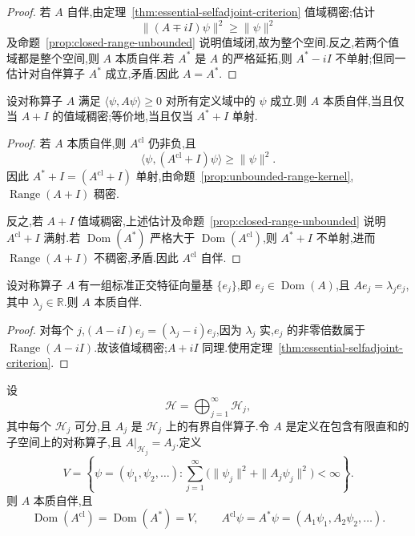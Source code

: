 \begin{proof}
若 \(A\) 自伴,由定理~\ref{thm:essential-selfadjoint-criterion} 值域稠密;估计
\[
\|(A\mp iI)\psi\|^{2}\geq\|\psi\|^{2}
\]
及命题~\ref{prop:closed-range-unbounded} 说明值域闭,故为整个空间.反之,若两个值域都是整个空间,则 \(A\) 本质自伴.若 \(A^{*}\) 是 \(A\) 的严格延拓,则 \(A^{*}-iI\) 不单射;但同一估计对自伴算子 \(A^{*}\) 成立,矛盾.因此 \(A=A^{*}\).
\end{proof}

\begin{theorem}[非负对称算子的判据]\label{thm:nonnegative-essential-selfadjoint}
设对称算子 \(A\) 满足 \(\langle\psi,A\psi\rangle\geq0\) 对所有定义域中的 \(\psi\) 成立.则 \(A\) 本质自伴,当且仅当 \(A+I\) 的值域稠密;等价地,当且仅当 \(A^{*}+I\) 单射.
\end{theorem}

\begin{proof}
若 \(A\) 本质自伴,则 \(A^{\mathrm{cl}}\) 仍非负,且
\[
\langle\psi,(A^{\mathrm{cl}}+I)\psi\rangle
\geq\|\psi\|^{2}.
\]
因此 \(A^{*}+I=(A^{\mathrm{cl}}+I)\) 单射,由命题~\ref{prop:unbounded-range-kernel},\(\operatorname{Range}(A+I)\) 稠密.

反之,若 \(A+I\) 值域稠密,上述估计及命题~\ref{prop:closed-range-unbounded} 说明 \(A^{\mathrm{cl}}+I\) 满射.若 \(\operatorname{Dom}(A^{*})\) 严格大于 \(\operatorname{Dom}(A^{\mathrm{cl}})\),则 \(A^{*}+I\) 不单射,进而 \(\operatorname{Range}(A+I)\) 不稠密,矛盾.因此 \(A^{\mathrm{cl}}\) 自伴.
\end{proof}

\begin{example}[有标准正交特征向量基的对称算子]\label{ex:symmetric-orthonormal-eigenbasis}
设对称算子 \(A\) 有一组标准正交特征向量基 \(\{e_{j}\}\),即 \(e_{j}\in\operatorname{Dom}(A)\),且 \(Ae_{j}=\lambda_{j}e_{j}\),其中 \(\lambda_{j}\in\mathbb{R}\).则 \(A\) 本质自伴.
\end{example}

\begin{proof}
对每个 \(j\),\((A-iI)e_{j}=(\lambda_{j}-i)e_{j}\),因为 \(\lambda_{j}\) 实,\(e_{j}\) 的非零倍数属于 \(\operatorname{Range}(A-iI)\).故该值域稠密;\(A+iI\) 同理.使用定理~\ref{thm:essential-selfadjoint-criterion}.
\end{proof}

\begin{example}\label{ex:direct-sum-essential-selfadjoint}
设
\[
\mathcal{H}=\bigoplus_{j=1}^{\infty}\mathcal{H}_{j},
\]
其中每个 \(\mathcal{H}_{j}\) 可分,且 \(A_{j}\) 是 \(\mathcal{H}_{j}\) 上的有界自伴算子.令 \(A\) 是定义在包含有限直和的子空间上的对称算子,且 \(A|_{\mathcal{H}_{j}}=A_{j}\).定义
\[
V=\left\{\psi=(\psi_{1},\psi_{2},\ldots):\sum_{j=1}^{\infty}\bigl(\|\psi_{j}\|^{2}+\|A_{j}\psi_{j}\|^{2}\bigr)<\infty\right\}.
\]
则 \(A\) 本质自伴,且
\[
\operatorname{Dom}(A^{\mathrm{cl}})=\operatorname{Dom}(A^{*})=V,
\qquad
A^{\mathrm{cl}}\psi=A^{*}\psi=(A_{1}\psi_{1},A_{2}\psi_{2},\ldots).
\]
\end{example}

